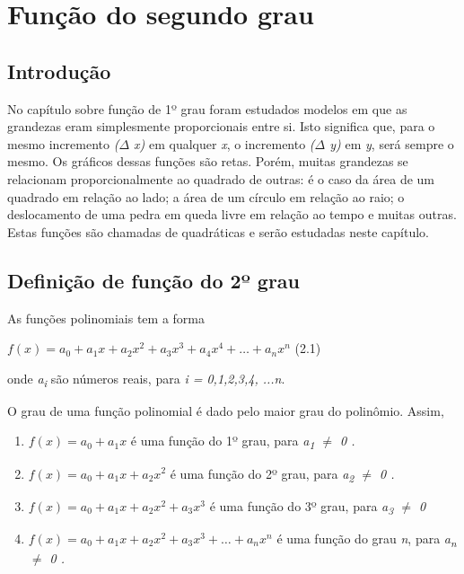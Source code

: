 \chapter{Função do segundo grau}

\section{Introdução}

No capítulo sobre função de 1º grau foram estudados modelos em que as grandezas eram simplesmente proporcionais entre si. Isto significa que, para o mesmo incremento \textit{($ \Delta $ x) }em qualquer \textit{x}, o incremento \textit{($ \Delta $ y) }em \textit{y}, será sempre o mesmo. Os gráficos dessas funções são retas. Porém, muitas grandezas se relacionam proporcionalmente ao quadrado de outras: é o caso da área de um quadrado em relação ao lado; a área de um círculo em relação ao raio; o deslocamento de uma pedra em queda livre em relação ao tempo e muitas outras. Estas funções são chamadas de quadráticas e serão estudadas neste capítulo. 

\section{Definição de função do 2º grau }

As funções polinomiais tem a forma 

 \( f \left( x \right) =a_{0}+a_{1}x+a_{2}x^{2}+a_{3}x^{3}+a_{4}x^{4}+ \ldots +a_{n}x^{n} \) \tab (2.1)

onde \textit{a\textsubscript{i}} são números reais, para \textit{i = 0,1,2,3,4, ...n}.

O grau de uma função polinomial é dado pelo maior grau do polinômio. Assim,

\begin{enumerate}
	\item  \( f \left( x \right) = a_{0}+a_{1}x \)    é uma função do 1º grau, para    \textit{a\textsubscript{1} $ \neq $  0  .}

	\item  \( f \left( x \right) =a_{0}+a_{1}x+a_{2}x^{2} \)    é uma função do 2º grau, para    \textit{a\textsubscript{2} $ \neq $  0 . }

	\item  \( f \left( x \right) =a_{0}+a_{1}x+a_{2}x^{2}+a_{3}x^{3} \)    é uma função do 3º grau, para    \textit{a\textsubscript{3} $ \neq $  0  }

	\item  \( f \left( x \right) =a_{0}+a_{1}x+a_{2}x^{2}+a_{3}x^{3}+ \ldots +a_{n}x^{n} \)       é uma função do grau \textit{n}, para    \textit{a\textsubscript{n} $ \neq $  0  .}
\end{enumerate}

